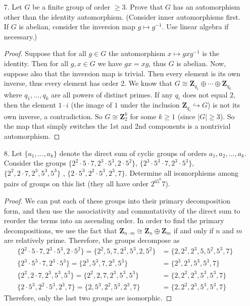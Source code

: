 \documentclass[10pt]{article}
\newcommand{\Z}{\mathbf{Z}}
\begin{document}
\begin{enumerate}
\begin{proof}
We showed in the first homework that a subgroup of finite index contains a normal subgroup of finite index.  So there is some $N \leq H$ such that $(G : N) = m$ is finite.  So for all $g \in G$, $(gN)^m = g^m N = N$, thus $g^m \in N \subseteq H$.
\end{proof}

\item[7.] Let $G$ be a finite group of order $\geq 3$.  Prove that $G$ has an automorphism other than the identity automorphism. (Consider inner automorphisms first.  If $G$ is abelian, consider the inversion map $g \mapsto g^{-1}$.  Use linear algebra if necessary.)

\begin{proof}
Suppose that for all $g \in G$ the automorphism $x \mapsto gxg^{-1}$ is the identity.  Then for all $g,x \in G$ we have $gx = xg$, thus $G$ is abelian.  Now, suppose also that the inversion map is trivial.  Then every element is its own inverse, thus every element has order 2.  We know that $G \cong \Z_{q_1} \oplus \cdots \oplus \Z_{q_k}$ where $q_1, \dots , q_k$ are all powers of distinct primes.  If any $q_i$ does not equal $2$, then the element $1 \cdot i$ (the image of $1$ under the inclusion $\Z_{q_i} \hookrightarrow G$) is not its own inverse, a contradiction.  So $G \cong \Z_{2}^k$ for some $k \geq 1$ (since $|G| \geq 3$).  So the map that simply switches the 1st and 2nd components is a nontrivial automorphism.
\end{proof}

\item[8.] Let $\{a_1 , \dots , a_k\}$ denote the direct sum of cyclic groups of orders $a_1, a_2, \dots , a_k$.  Consider the groups $\{2^2 \cdot 5 \cdot 7 , 2^3 \cdot 5^3, 2 \cdot 5^2 \}$, $\{2^3 \cdot 5^3 \cdot 7, 2^3 \cdot 5^3\}$, $\{2^2, 2 \cdot 7, 2^3 , 5^3 , 5^3 \}$ , $\{2 \cdot 5^3, 2^2 \cdot 5^3, 2^3 , 7 \}$.  Determine all isomorphisms among pairs of groups on this list (they all have order $2^65^6 7$).

\begin{proof}
We can put each of these groups into their primary decomposition form, and then use the associativity and commutativity of the direct sum to reorder the terms into an ascending order.  In order to find the primary decompositions, we use the fact that $\Z_{n\cdot m} \cong \Z_n \oplus \Z_m$ if and only if $n$ and $m$ are relatively prime.  Therefore, the groups decompose as
\begin{align*}
\{2^2 \cdot 5 \cdot 7 , 2^3 \cdot 5^3, 2 \cdot 5^2 \} =\{2^2, 5, 7, 2^3 , 5^3, 2, 5^2\} &= \{2, 2^2, 2^3, 5, 5^2 , 5^3, 7\} \\
\{2^3 \cdot 5^3 \cdot 7, 2^3 \cdot 5^3\} = \{2^3, 5^3, 7, 2^3, 5^3\} &= \{2^3, 2^3, 5^3, 5^3, 7\} \\
\{2^2, 2 \cdot 7, 2^3 , 5^3 , 5^3 \} = \{2^2, 2, 7, 2^3 , 5^3 , 5^3 \} &= \{2, 2^2, 2^3, 5^3, 5^3, 7\} \\
\{2 \cdot 5^3, 2^2 \cdot 5^3, 2^3 , 7 \} = \{2, 5^3, 2^2, 5^3, 2^3 , 7 \} &= \{2, 2^2, 2^3, 5^3, 5^3, 7\}
\end{align*}
Therefore, only the last two groups are isomorphic.
\end{proof}

\end{enumerate}
\end{document}
